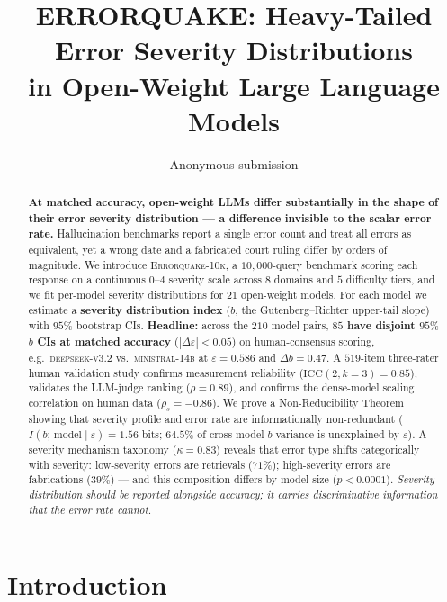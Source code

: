 \documentclass{article}
\title{ERRORQUAKE: Heavy-Tailed Error Severity Distributions\\
in Open-Weight Large Language Models}
\author{Anonymous submission}
\newcommand{\sdi}{\ensuremath{b}}
\begin{document}
\maketitle

\begin{abstract}
\textbf{At matched accuracy, open-weight LLMs differ substantially
in the shape of their error severity distribution --- a difference
invisible to the scalar error rate.} Hallucination benchmarks
report a single error count and treat all errors as equivalent,
yet a wrong date and a fabricated court ruling differ by orders of
magnitude. We introduce
\textsc{Errorquake-10k}, a $10{,}000$-query benchmark scoring each
response on a continuous $0$--$4$ severity scale across $8$ domains
and $5$ difficulty tiers, and we fit per-model severity
distributions for $21$ open-weight models. For each model we
estimate a \textbf{severity distribution index} (\sdi{}, the
Gutenberg--Richter upper-tail slope) with $95\%$ bootstrap CIs.
\textbf{Headline:} across the $210$ model pairs, \textbf{$85$ have
disjoint $95\%$ \sdi{} CIs at matched accuracy}
($|\Delta\varepsilon|<0.05$) on human-consensus scoring, e.g.\
\textsc{deepseek-v3.2} vs.\ \textsc{ministral-14b} at
$\varepsilon=0.586$ and $\Delta\sdi = 0.47$. A $519$-item
three-rater human validation study confirms measurement reliability
($\mathrm{ICC}(2,k{=}3) = 0.85$), validates the LLM-judge ranking
($\rho = 0.89$), and confirms the dense-model scaling correlation
on human data ($\rho_s = -0.86$). We prove a Non-Reducibility
Theorem showing that severity profile and error rate are
informationally non-redundant ($I(\sdi;\,\text{model} \mid
\varepsilon) = 1.56$ bits; $64.5\%$ of cross-model \sdi{} variance
is unexplained by $\varepsilon$). A severity mechanism taxonomy
($\kappa = 0.83$) reveals that error type shifts categorically
with severity: low-severity errors are retrievals ($71\%$);
high-severity errors are fabrications ($39\%$) --- and this
composition differs by model size ($p < 0.0001$). \emph{Severity
distribution should be reported alongside accuracy; it carries
discriminative information that the error rate cannot.}
\end{abstract}

\section{Introduction}\label{sec:intro}
\end{document}
